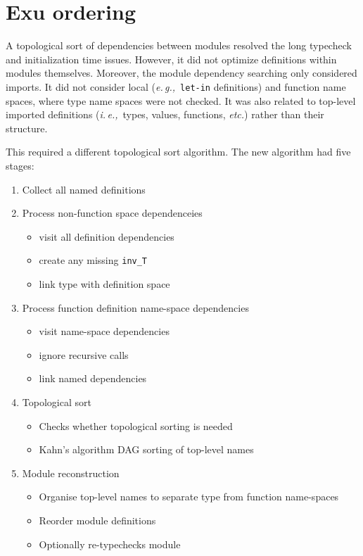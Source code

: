 \documentclass[runningheads,a4paper]{llncs}
\newcommand{\eg}{{\em e.\,g.,\/}}
\newcommand{\ie}{{\em i.\,e.,\/}}
\newcommand{\etc}{{\em etc.\/}}
\begin{document}
\section{Exu ordering}\label{sec:exu}

A topological sort of dependencies between modules resolved the long typecheck and initialization time issues. However, it did not optimize definitions within modules themselves. Moreover, the module dependency searching only considered imports. It did not consider local (\eg~\texttt{let-in} definitions) and function name spaces, where type name spaces were not checked. It was also related to top-level imported definitions (\ie~types, values, functions, \etc) rather than their structure.      

This required a different topological sort algorithm. The new algorithm had five stages: 
%
\begin{enumerate} 
    \item Collect all named definitions
    \item Process non-function space dependenceies
        \begin{itemize}
            \item visit all definition dependencies 
            \item create any missing \verb'inv_T'
            \item link type with definition space  
        \end{itemize}
    \item Process function definition name-space dependencies 
        \begin{itemize}
            \item visit name-space dependencies 
            \item ignore recursive calls
            \item link named dependencies  
        \end{itemize}
    \item Topological sort
        \begin{itemize}
            \item Checks whether topological sorting is needed  
            \item Kahn's algorithm DAG sorting of top-level names 
         \end{itemize}
    \item Module reconstruction
         \begin{itemize}
             \item Organise top-level names to separate type from function name-spaces  
             \item Reorder module definitions 
             \item Optionally re-typechecks module 
          \end{itemize}
\end{enumerate}  
\end{document}
